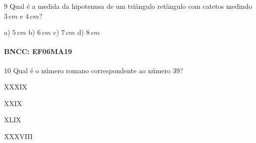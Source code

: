 {%

\num{9}  Qual é a medida da hipotenusa de um triângulo retângulo com catetos
medindo $3\,cm$ e $4\,cm$?

\begin{escolha}
a) $5\,cm$
b) $6\,cm$
c) $7\,cm$
d) $8\,cm$
\end{escolha}

\paragraph{BNCC: EF06MA19 }


\num{10} Qual é o número romano correspondente ao número $39$?

\begin{escolha}
\item XXXIX 
\item XXIX 
\item XLIX 
\item XXXVIII
\end{escolha}

}
